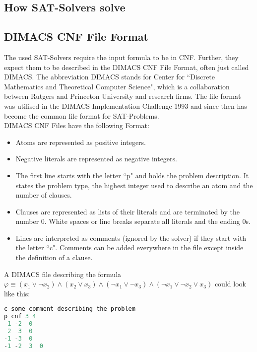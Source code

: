 \subsection{How SAT-Solvers solve}

\subsection{DIMACS CNF File Format}
The used SAT-Solvers require the input formula to be in CNF. Further, they expect them to be described in the DIMACS CNF File Format, often just called DIMACS. The abbreviation DIMACS stands for Center for ``Discrete Mathematics and Theoretical Computer Science", which is a collaboration between Rutgers and Princeton University and research firms. The file format was utilised in the DIMACS Implementation Challenge 1993 and since then has become the common file format for SAT-Problems.\\

DIMACS CNF Files have the following Format:
\begin{itemize}
    \item Atoms are represented as positive integers.
    \item Negative literals are represented as negative integers.
    \item The first line starts with the letter ``p" and holds the problem description. It states the problem type, the highest integer used to describe an atom and the number of clauses.
    \item Clauses are represented as lists of their literals and are terminated by the number 0. White spaces or line breaks separate all literals and the ending 0s.
    \item Lines are interpreted as comments (ignored by the solver) if they start with the letter ``c". Comments can be added everywhere in the file except inside the definition of a clause.
\end{itemize}
A DIMACS file describing the formula $\varphi \equiv (x_1 \lor \neg x_2) \land (x_2 \lor x_3) \land (\neg x_1 \lor \neg x_3) \land (\neg x_1 \lor \neg x_2 \lor x_3)$ could look like this:

\lstset{basicstyle=\ttfamily}
\begin{lstlisting}[language=Java,frame=single]
c some comment describing the problem
p cnf 3 4
 1 -2  0
 2  3  0
-1 -3  0
-1 -2  3  0
\end{lstlisting}

